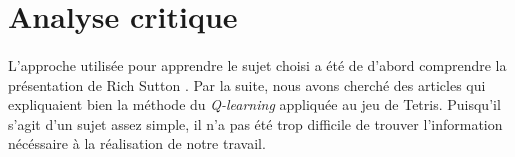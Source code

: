 \documentclass[a4paper, 12pt]{article} %
\begin{document}
\section{Analyse critique}
    \paragraph{}
    L'approche utilisée pour apprendre le sujet choisi a été de d'abord comprendre la présentation de Rich Sutton \cite{qlearning}.
    Par la suite, nous avons cherché des articles qui expliquaient bien la méthode du \textit{Q-learning} appliquée au jeu de Tetris.
    Puisqu'il s'agit d'un sujet assez simple, il n'a pas été trop difficile de trouver l'information nécéssaire à la réalisation
    de notre travail.


\pagebreak[4]



\end{document}
